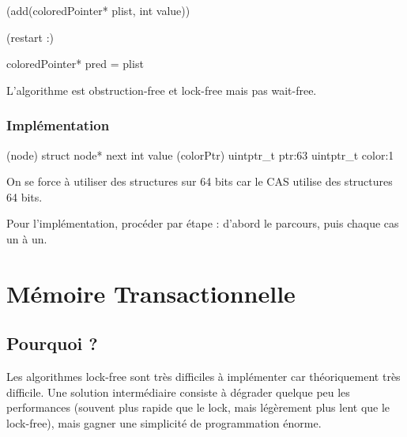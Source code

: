 \documentclass{article}
\begin{document}
\begin{algorithm}[H]
\Void({add(coloredPointer* plist, int value)}){
	\Label(restart :){
		coloredPointer* pred = plist\;
		
		
	}
}

\end{algorithm}


L'algorithme est obstruction-free et lock-free mais pas wait-free.

\subsubsection*{Implémentation}
\begin{algorithm}[H]
\Struct(node){
	struct node* next\;
	int value\;
}
\Struct(colorPtr){
	uintptr\_t ptr:63
	uintptr\_t color:1\;
}
\end{algorithm}
On se force à utiliser des structures sur 64 bits car le CAS utilise des structures 64 bits.
\bigskip

Pour l'implémentation, procéder par étape : d'abord le parcours, puis chaque cas un à un.



\section{Mémoire Transactionnelle}
\subsection{Pourquoi ?}
Les algorithmes lock-free sont très difficiles à implémenter car théoriquement très difficile. Une solution intermédiaire consiste à dégrader quelque peu les performances (souvent plus rapide que le lock, mais légèrement plus lent que le lock-free), mais gagner une simplicité de programmation énorme.
\end{document}
